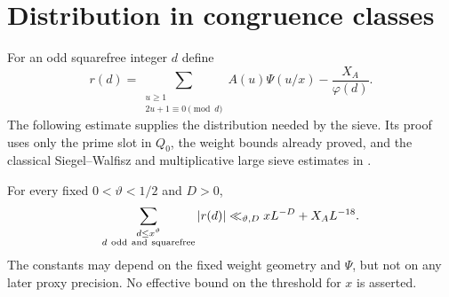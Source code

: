 \section{Distribution in congruence classes}\label{cg:section}

For an odd squarefree integer $d$ define
\begin{equation}\label{cg:remainder}
 r(d)=\sum_{\substack{u\ge1\\2u+1\equiv0\pmod d}}
                    A(u)\Psi(u/x)-\frac{X_A}{\varphi(d)}.
\end{equation}
The following estimate supplies the distribution needed by the sieve.
Its proof uses only the prime slot in $Q_0$, the weight bounds already
proved, and the classical Siegel--Walfisz and multiplicative large
sieve estimates in
\cite[Section ``Notation and preliminary estimates'']{SmoothShifted}.

\begin{theorem}\label{cg:distribution}
For every fixed $0<\vartheta<1/2$ and $D>0$,
\[
 \sum_{\substack{d\le x^\vartheta\\d\ {\rm odd\ and\ squarefree}}}
       |r(d)|\ll_{\vartheta,D}xL^{-D}+X_A L^{-18}.
\]
The constants may depend on the fixed weight geometry and $\Psi$,
but not on any later proxy precision. No effective bound on the
threshold for $x$ is asserted.
\end{theorem}

